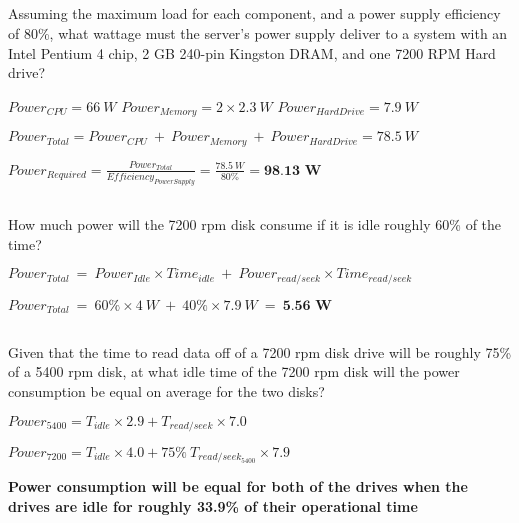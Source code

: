 \documentclass{article}
\begin{document}
\begin{adjustwidth}{2.5em}{0pt}
\subsection{}
Assuming the maximum load for each component, and a power supply efficiency of 80\%, what wattage must the server's power supply deliver to a system with an Intel Pentium 4 chip, 2 GB 240-pin Kingston DRAM, and one 7200 RPM Hard drive?

\vspace{5mm}
$Power_{CPU}=66\ W$  
$Power_{Memory}=2\times2.3\ W$  
$Power_{Hard Drive}=7.9\ W$

\vspace{3mm}
$Power_{Total}=Power_{CPU}\ +\ Power_{Memory}\ +\ Power_{Hard Drive}=78.5\ W$

\vspace{3mm}
$Power_{Required}=\frac{Power_{Total}}{Efficiency_{Power Supply}}=\frac{78.5\ W}{80\%}=\textbf{98.13\ W}$


\subsection{}
How much power will the 7200 rpm disk consume if it is idle roughly 60\% of the time?

\vspace{5mm}
$Power_{Total}\ =\ Power_{Idle}\times{}Time_{idle}\ +\ Power_{read/seek}\times{}Time_{read/seek}$

\vspace{3mm}
$Power_{Total}\ =\ 60\%\times{}4\ W\ +\ 40\%\times{}7.9\ W\ =\ \textbf{5.56\ W}$

\subsection{}
Given that the time to read data off of a 7200 rpm disk drive will be roughly 75\% of a 5400 rpm disk, at what idle time of the 7200 rpm disk will the power consumption be equal on average for the two disks? 

\vspace{5mm}
$Power_{5400}=T_{idle}\times{}2.9+T_{read/seek}\times{}7.0$

\vspace{3mm}
$Power_{7200}=T_{idle}\times{}4.0+75\%\ T_{read/seek_{5400}}\times{}7.9$ 

\textbf{Power consumption will be equal for both of the drives when the drives are idle for roughly 33.9\% of their operational time}
\vspace{3mm}
\end{adjustwidth}
\pagebreak
\end{document}
